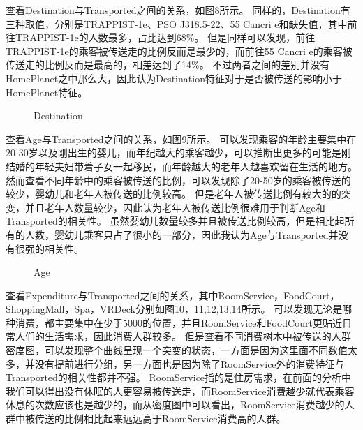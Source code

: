 \documentclass[../main.tex]{subfiles}
\begin{document}
        查看Destination与Transported之间的关系，如图8所示。
        同样的，Destination有三种取值，分别是TRAPPIST-1e、PSO J318.5-22、55 Cancri e和缺失值，其中前往TRAPPIST-1e的人数最多，占比达到68\%。
        但是同样可以发现，前往TRAPPIST-1e的乘客被传送走的比例反而是最少的，而前往55 Cancri e的乘客被传送走的比例反而是最高的，相差达到了14\%。
        不过两者之间的差别并没有HomePlanet之中那么大，因此认为Destination特征对于是否被传送的影响小于HomePlanet特征。

        \begin{figure}[H]
            \centering
            \label{tu2_8}
            \caption{Destination}
        \end{figure}

        查看Age与Transported之间的关系，如图9所示。
        可以发现乘客的年龄主要集中在20-30岁以及刚出生的婴儿，而年纪越大的乘客越少，可以推断出更多的可能是刚结婚的年轻夫妇带着子女一起移民，而年龄越大的老年人越喜欢留在生活的地方。
        然而查看不同年龄中的乘客被传送的比例，可以发现除了20-50岁的乘客被传送的较少，婴幼儿和老年人被传送的比例较高。
        但是老年人被传送比例有较大的的突变，并且老年人数量较少，因此认为老年人被传送比例很难用于判断Age和Transported的相关性。
        虽然婴幼儿数量较多并且被传送比例较高，但是相比起所有的人数，婴幼儿乘客只占了很小的一部分，因此我认为Age与Transported并没有很强的相关性。

        \begin{figure}[H]
            \centering
            \caption{Age}
        \end{figure}

        查看Expenditure与Transported之间的关系，其中RoomService，FoodCourt，ShoppingMall，Spa，VRDeck分别如图10，11,12,13,14所示。
        可以发现无论是哪种消费，都主要集中在少于5000的位置，并且RoomService和FoodCourt更贴近日常人们的生活需求，因此消费人群较多。
        但是查看不同消费树木中被传送的人群密度图，可以发现整个曲线呈现一个突变的状态，一方面是因为这里面不同数值太多，并没有提前进行分组，另一方面也是因为除了RoomService外的消费特征与Transported的相关性都并不强。
        RoomService指的是住房需求，在前面的分析中我们可以得出没有休眠的人更容易被传送走，而RoomService消费越少就代表乘客休息的次数应该也是越少的，而从密度图中可以看出，RoomService消费越少的人群中被传送的比例相比起来远远高于RoomService消费高的人群。
        
\end{document}
